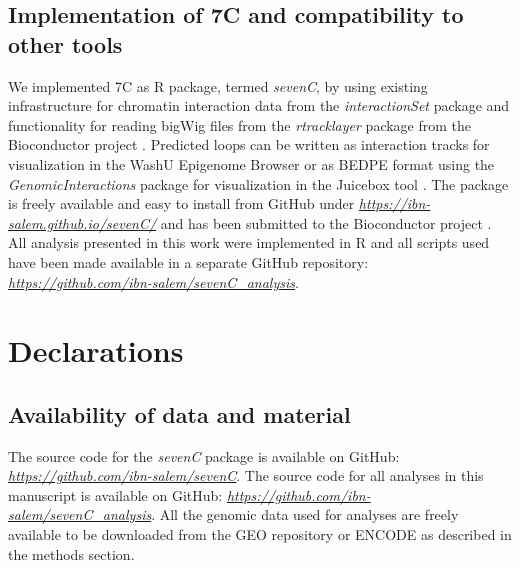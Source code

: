 \documentclass[a4paper,twoside=true,openright,parskip=full,chapterprefix=true,11pt,headings=normal,bibliography=totoc,listof=totoc,titlepage=on,captions=tableabove,draft=false]{scrreprt}
\theoremstyle{definition}
\theoremstyle{definition}
\theoremstyle{definition}
\theoremstyle{remark}
\begin{document}
\hypertarget{implementation-of-7c-and-compatibility-to-other-tools}{%
\subsection{Implementation of 7C and compatibility to other
tools}\label{implementation-of-7c-and-compatibility-to-other-tools}}

We implemented 7C as R package, termed \emph{sevenC}, by using existing
infrastructure for chromatin interaction data from the
\emph{interactionSet} package \citep{Lun2016} and functionality for
reading bigWig files from the \emph{rtracklayer} package
\citep{Lawrence2009} from the Bioconductor project \citep{Huber2015}.
Predicted loops can be written as interaction tracks for visualization
in the WashU Epigenome Browser \citep{Zhou2013} or as BEDPE format using
the \emph{GenomicInteractions} package \citep{Harmston2015} for
visualization in the Juicebox tool \citep{Durand2016}. The package is
freely available and easy to install from GitHub under
\href{https://ibn-salem.github.io/sevenC/}{\emph{https://ibn-salem.github.io/sevenC/}}
and has been submitted to the Bioconductor project \citep{Huber2015}.
All analysis presented in this work were implemented in R and all
scripts used have been made available in a separate GitHub repository:
\href{https://github.com/ibn-salem/chromloop_analysis}{\emph{https://github.com/ibn-salem/sevenC\_analysis}}.

\hypertarget{declarations-2}{%
\section*{Declarations}\label{declarations-2}}

\hypertarget{availability-of-data-and-material-1}{%
\subsection*{Availability of data and
material}\label{availability-of-data-and-material-1}}

The source code for the \emph{sevenC} package is available on GitHub:
\href{https://github.com/ibn-salem/sevenC}{\emph{https://github.com/ibn-salem/sevenC}}.
The source code for all analyses in this manuscript is available on
GitHub:
\href{https://github.com/ibn-salem/sevenC_analysis}{\emph{https://github.com/ibn-salem/sevenC\_analysis}}.
All the genomic data used for analyses are freely available to be
downloaded from the GEO repository or ENCODE as described in the methods
section.
\end{document}
